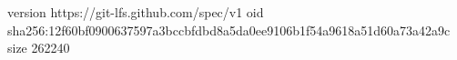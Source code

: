 version https://git-lfs.github.com/spec/v1
oid sha256:12f60bf0900637597a3bccbfdbd8a5da0ee9106b1f54a9618a51d60a73a42a9c
size 262240
